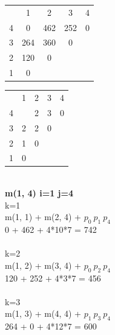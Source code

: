 \documentclass{article}
\begin{document}
    \begin{tabular}{ c | c | c | c | c }
            
        & 1 & 2 & 3 & 4 \\ 
    4 & 0 & 462 & 252 & 0 \\  
    3 & 264 & 360 & 0 \\
    2 & 120 & 0 \\
    1 & 0     
    \end{tabular}
    \begin{tabular}{ c | c | c | c | c }
            
        & 1 & 2 & 3 & 4 \\ 
      4 &   & 2 & 3 & 0 \\  
      3 & 2 & 2 & 0 \\
      2 & 1 & 0 \\
      1 & 0     
    \end{tabular}\\

    \textbf{m(1, 4) i=1 j=4} \\
    k=1 \\
    m(1, 1) + m(2, 4) + $ p_{0}\ p_{1}\  p_{4}$\\
    0 + 462 + 4*10*7 = 742 \\\\

    k=2 \\
    m(1, 2) + m(3, 4) + $ p_{0}\ p_{2}\  p_{4}$\\
    120 + 252 + 4*3*7 = 456\\\\

    k=3 \\
    m(1, 3) + m(4, 4) + $ p_{1}\ p_{3}\  p_{4}$\\
    264 + 0 + 4*12*7 = 600\\\\
\end{document}
